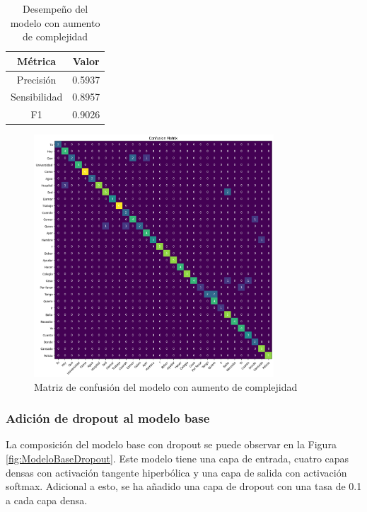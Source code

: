 \begin{table}[H]
    \centering
    \begin{tabular}{|c|c|}
        \hline
        \textbf{Métrica} & \textbf{Valor} \\
        \hline
        Precisión & 0.5937 \\
        \hline
        Sensibilidad & 0.8957 \\
        \hline
        F1 & 0.9026 \\
        \hline
    \end{tabular}
    \caption{Desempeño del modelo con aumento de complejidad}
    \label{tab:DesempeñoModeloComplejo}
\end{table}

\begin{figure}[H]
    \centering
    \includegraphics[width=0.8\textwidth]{figuras/modelComplexCM.png}
    \caption{Matriz de confusión del modelo con aumento de complejidad}
    \label{fig:CMModeloComplejo}
\end{figure}

\subsubsection{Adición de dropout al modelo base}
La composición del modelo base con dropout se puede observar en la Figura \ref{fig:ModeloBaseDropout}.
Este modelo tiene una capa de entrada, cuatro capas densas con activación tangente hiperbólica y una capa de salida con activación softmax.
Adicional a esto, se ha añadido una capa de dropout con una tasa de 0.1 a cada capa densa.

